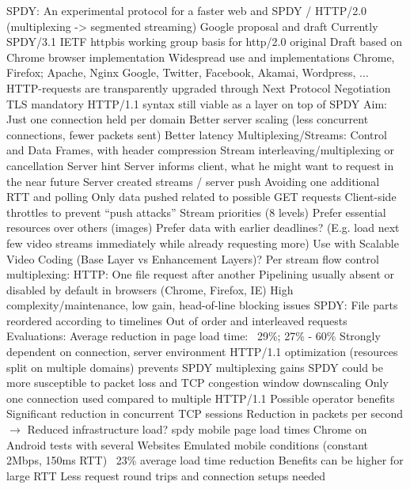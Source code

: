 SPDY: An experimental protocol for a faster web \cite{google2011SPDYdef} and \cite{google2010SPDYwp} 
SPDY / \gls{HTTP}/2.0 (multiplexing -> segmented streaming)
 Google proposal and draft
	Currently SPDY/3.1 
	IETF httpbis working group basis for http/2.0
 original Draft based on Chrome browser implementation
 Widespread use and implementations
	Chrome, Firefox; Apache, Nginx
	Google, Twitter, Facebook, Akamai, Wordpress, ...
	HTTP-requests are transparently upgraded through Next Protocol Negotiation
 TLS mandatory
 HTTP/1.1 syntax still viable as a layer on top of SPDY
 Aim: Just one connection held per domain
	Better server scaling (less concurrent connections, fewer packets sent)
	Better latency
Multiplexing/Streams:
 Control and Data Frames, with header compression
 Stream interleaving/multiplexing or cancellation
 Server hint
	Server informs client, what he might want to request in the near future
 Server created streams / server push
	Avoiding one additional RTT and polling
	Only data pushed related to possible GET requests
	Client-side throttles to prevent ``push attacks''
 Stream priorities (8 levels)
	Prefer essential resources over others (images)
	Prefer data with earlier deadlines? (E.g. load next few video streams immediately while already requesting more)
 Use with Scalable Video Coding (Base Layer vs Enhancement Layers)?
 Per stream flow control
multiplexing:
 HTTP: One file request after another
	Pipelining usually absent or disabled by default in browsers (Chrome, Firefox, IE)
	High complexity/maintenance, low gain, head-of-line blocking issues
 SPDY: File parts reordered according to timelines
	Out of order and interleaved requests
Evaluations:
	Average reduction in page load time: ~29\%; 27\% - 60\%
	Strongly dependent on connection, server environment
	HTTP/1.1 optimization (resources split on multiple domains) prevents SPDY multiplexing gains
 SPDY could be more susceptible to packet loss and TCP congestion window downscaling
	Only one connection used compared to multiple HTTP/1.1
 Possible operator benefits
	Significant reduction in concurrent TCP sessions
	Reduction in packets per second
	$\rightarrow$ Reduced infrastructure load?
spdy mobile page load times
 Chrome on Android tests with several Websites
 Emulated mobile conditions (constant 2Mbps, 150ms RTT)
 ~23\% average load time reduction
 Benefits can be higher for large RTT
	Less request round trips and connection setups needed



